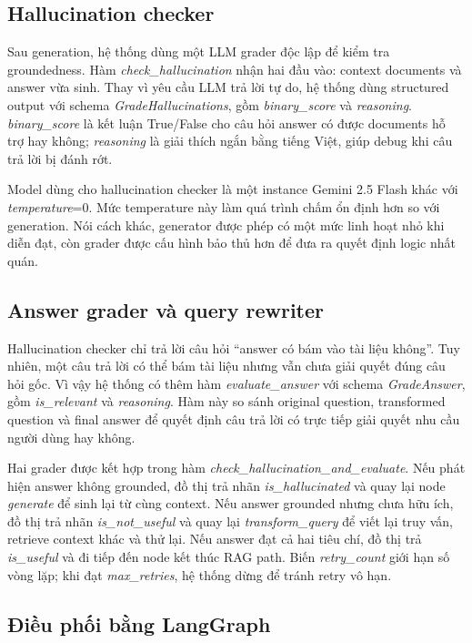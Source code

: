 \documentclass[11pt]{article}
\begin{document}
\subsection{Hallucination checker}

Sau generation, hệ thống dùng một LLM grader độc lập để kiểm tra groundedness. Hàm \textit{check\_hallucination} nhận hai đầu vào: context documents và answer vừa sinh. Thay vì yêu cầu LLM trả lời tự do, hệ thống dùng structured output với schema \textit{GradeHallucinations}, gồm \textit{binary\_score} và \textit{reasoning}. \textit{binary\_score} là kết luận True/False cho câu hỏi answer có được documents hỗ trợ hay không; \textit{reasoning} là giải thích ngắn bằng tiếng Việt, giúp debug khi câu trả lời bị đánh rớt.

Model dùng cho hallucination checker là một instance Gemini 2.5 Flash khác với \textit{temperature}=0. Mức temperature này làm quá trình chấm ổn định hơn so với generation. Nói cách khác, generator được phép có một mức linh hoạt nhỏ khi diễn đạt, còn grader được cấu hình bảo thủ hơn để đưa ra quyết định logic nhất quán.

\subsection{Answer grader và query rewriter}

Hallucination checker chỉ trả lời câu hỏi ``answer có bám vào tài liệu không''. Tuy nhiên, một câu trả lời có thể bám tài liệu nhưng vẫn chưa giải quyết đúng câu hỏi gốc. Vì vậy hệ thống có thêm hàm \textit{evaluate\_answer} với schema \textit{GradeAnswer}, gồm \textit{is\_relevant} và \textit{reasoning}. Hàm này so sánh original question, transformed question và final answer để quyết định câu trả lời có trực tiếp giải quyết nhu cầu người dùng hay không.

Hai grader được kết hợp trong hàm \textit{check\_hallucination\_and\_evaluate}. Nếu phát hiện answer không grounded, đồ thị trả nhãn \textit{is\_hallucinated} và quay lại node \textit{generate} để sinh lại từ cùng context. Nếu answer grounded nhưng chưa hữu ích, đồ thị trả nhãn \textit{is\_not\_useful} và quay lại \textit{transform\_query} để viết lại truy vấn, retrieve context khác và thử lại. Nếu answer đạt cả hai tiêu chí, đồ thị trả \textit{is\_useful} và đi tiếp đến node kết thúc RAG path. Biến \textit{retry\_count} giới hạn số vòng lặp; khi đạt \textit{max\_retries}, hệ thống dừng để tránh retry vô hạn.

\subsection{Điều phối bằng LangGraph}
\end{document}
